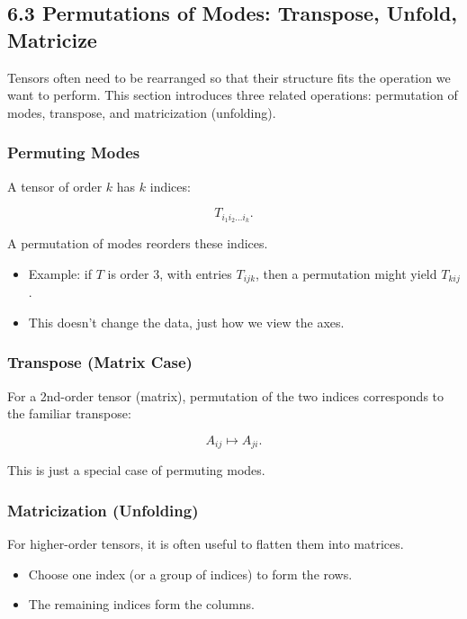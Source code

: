 \documentclass[
  letterpaper,
  DIV=11,
  numbers=noendperiod]{scrreprt}
\providecommand{\tightlist}{%
  \setlength{\itemsep}{0pt}\setlength{\parskip}{0pt}}
\begin{document}
\subsection{6.3 Permutations of Modes: Transpose, Unfold,
Matricize}\label{permutations-of-modes-transpose-unfold-matricize}

Tensors often need to be rearranged so that their structure fits the
operation we want to perform. This section introduces three related
operations: permutation of modes, transpose, and matricization
(unfolding).

\subsubsection{Permuting Modes}\label{permuting-modes}

A tensor of order \(k\) has \(k\) indices:

\[
T_{i_1 i_2 \dots i_k}.
\]

A permutation of modes reorders these indices.

\begin{itemize}
\tightlist
\item
  Example: if \(T\) is order 3, with entries \(T_{ijk}\), then a
  permutation might yield \(T_{kij}\).
\item
  This doesn't change the data, just how we view the axes.
\end{itemize}

\subsubsection{Transpose (Matrix Case)}\label{transpose-matrix-case}

For a 2nd-order tensor (matrix), permutation of the two indices
corresponds to the familiar transpose:

\[
A_{ij} \mapsto A_{ji}.
\]

This is just a special case of permuting modes.

\subsubsection{Matricization (Unfolding)}\label{matricization-unfolding}

For higher-order tensors, it is often useful to flatten them into
matrices.

\begin{itemize}
\tightlist
\item
  Choose one index (or a group of indices) to form the rows.
\item
  The remaining indices form the columns.
\end{itemize}
\end{document}
